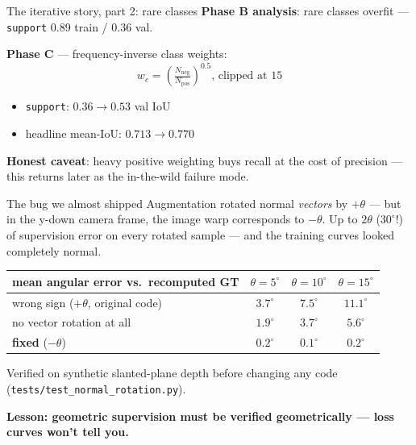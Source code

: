 \documentclass[aspectratio=169,10pt]{beamer}
\begin{document}
\begin{frame}{The iterative story, part 2: rare classes}
  \textbf{Phase B analysis}: rare classes overfit ---
  \texttt{support} 0.89 train / \alert{0.36 val}.
  \medskip

  \textbf{Phase C} --- frequency-inverse class weights:
  \begin{equation*}
    w_c = \left(\tfrac{N_{\text{neg}}}{N_{\text{pos}}}\right)^{0.5}
    \text{, clipped at } 15
  \end{equation*}
  \begin{itemize}
    \item \texttt{support}: $0.36 \rightarrow 0.53$ val IoU
    \item headline mean-IoU: $0.713 \rightarrow 0.770$
  \end{itemize}
  \medskip
  \textbf{Honest caveat}: heavy positive weighting buys recall at the cost of
  precision --- this returns later as the in-the-wild failure mode.
\end{frame}

\begin{frame}{The bug we almost shipped}
  Augmentation rotated normal \emph{vectors} by $+\theta$ --- but in the
  y-down camera frame, the image warp corresponds to $-\theta$.
  Up to $2\theta$ ($30^\circ$!) of supervision error on every rotated sample
  --- \alert{and the training curves looked completely normal.}
  \medskip
  \begin{center}
    \begin{tabular}{lccc}
      \toprule
      mean angular error vs.\ recomputed GT & $\theta=5^\circ$ & $\theta=10^\circ$ & $\theta=15^\circ$ \\
      \midrule
      wrong sign ($+\theta$, original code) & $3.7^\circ$ & $7.5^\circ$ & $11.1^\circ$ \\
      no vector rotation at all             & $1.9^\circ$ & $3.7^\circ$ & $5.6^\circ$ \\
      \textbf{fixed} ($-\theta$)            & $\mathbf{0.2^\circ}$ & $\mathbf{0.1^\circ}$ & $\mathbf{0.2^\circ}$ \\
      \bottomrule
    \end{tabular}
  \end{center}
  \smallskip
  {\small Verified on synthetic slanted-plane depth before changing any code
  (\texttt{tests/test\_normal\_rotation.py}).}
  \medskip
  \begin{center}
    \alert{\textbf{Lesson: geometric supervision must be verified geometrically ---
    loss curves won't tell you.}}
  \end{center}
\end{frame}
\end{document}

